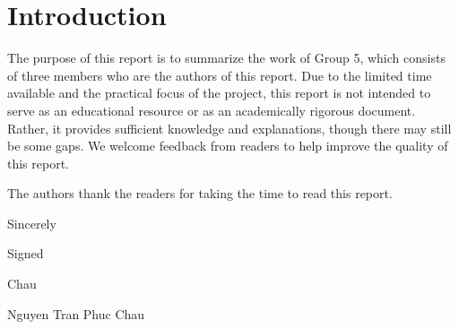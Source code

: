 \documentclass[a4paper,12pt]{article}
\begin{document}
\section*{Introduction}
The purpose of this report is to summarize the work of Group 5, which consists of three members who are the authors of this report. Due to the limited time available and the practical focus of the project, this report is not intended to serve as an educational resource or as an academically rigorous document. Rather, it provides sufficient knowledge and explanations, though there may still be some gaps. We welcome feedback from readers to help improve the quality of this report.

The authors thank the readers for taking the time to read this report.

Sincerely 
\begin{flushright}
Signed

Chau

Nguyen Tran Phuc Chau
\end{flushright}

\newpage
\setcounter{tocdepth}{3}
\tableofcontents 
\newpage
\end{document}
